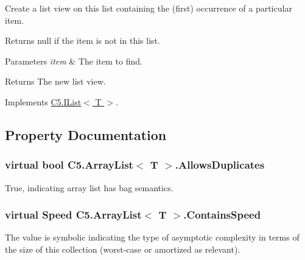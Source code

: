 Create a list view on this list containing the (first) occurrence of a particular item. 

Returns {\ttfamily null} if the item is not in this list.


\begin{DoxyParams}{Parameters}
{\em item} & The item to find.\\
\hline
\end{DoxyParams}
\begin{DoxyReturn}{Returns}
The new list view.
\end{DoxyReturn}


Implements \hyperlink{interface_c5_1_1_i_list_aefcdef9983913d18ae05394e77a44c71}{C5.\+I\+List$<$ T $>$}.



\subsection{Property Documentation}
\hypertarget{class_c5_1_1_array_list_a543195d51a2e01b58772297e079f3a17}{}
\subsubsection[{Allows\+Duplicates}]{\setlength{\rightskip}{0pt plus 5cm}virtual bool {\bf C5.\+Array\+List}$<$ T $>$.Allows\+Duplicates\hspace{0.3cm}{\ttfamily [get]}}\label{class_c5_1_1_array_list_a543195d51a2e01b58772297e079f3a17}




True, indicating array list has bag semantics.\hypertarget{class_c5_1_1_array_list_a4ecabee5bf4516170750cf2bdf1384f0}{}
\subsubsection[{Contains\+Speed}]{\setlength{\rightskip}{0pt plus 5cm}virtual {\bf Speed} {\bf C5.\+Array\+List}$<$ T $>$.Contains\+Speed\hspace{0.3cm}{\ttfamily [get]}}\label{class_c5_1_1_array_list_a4ecabee5bf4516170750cf2bdf1384f0}


The value is symbolic indicating the type of asymptotic complexity in terms of the size of this collection (worst-\/case or amortized as relevant). 

